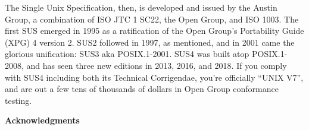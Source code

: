 \documentclass[letterpaper,10pt]{article}
\begin{document}
\begin{appendices}
The Single Unix Specification, then, is developed and issued by the Austin
Group, a combination of ISO JTC 1 SC22, the Open Group, and ISO 1003. The first
SUS emerged in 1995 as a ratification of the Open Group's Portability Guide (XPG)
4 version 2. SUS2 followed in 1997, as mentioned, and in 2001 came the glorious
unification: SUS3 aka POSIX.1-2001. SUS4 was built atop POSIX.1-2008, and has
seen three new editions in 2013, 2016, and 2018. If you comply with SUS4 including
both its Technical Corrigendae, you're officially ``UNIX V7'', and are out a few
tens of thousands of dollars in Open Group conformance testing.

\cleardoublepage

%

\end{appendices}
\cleardoublepage
\glsaddallunused
\printglossary[title={Glossary of terms}]
\cleardoublepage
\printbibliography
\cleardoublepage
\vspace*{1in}
\begin{center}\textbf{Acknowledgments}\end{center}
\end{document}
